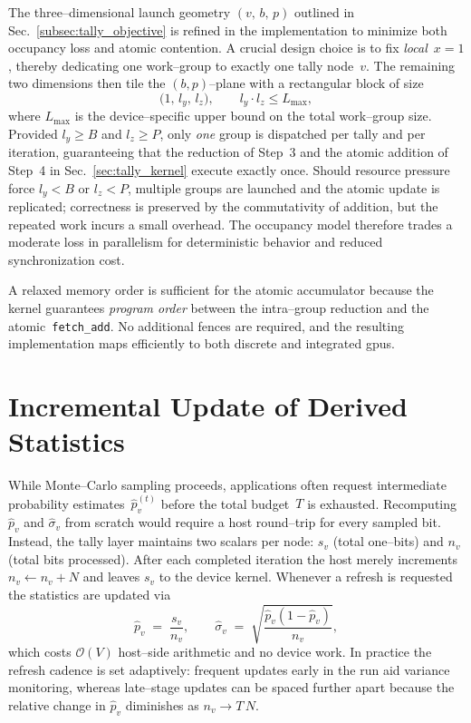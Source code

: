 The three--dimensional launch geometry \((v,\,b,\,p)\) outlined in
Sec.~\ref{subsec:tally_objective} is refined in the implementation to minimize
both occupancy loss and atomic contention.  A crucial design choice is to fix
\emph{local}~\(x=1\), thereby dedicating one work--group to exactly one tally
node~\(v\).  The remaining two dimensions then tile the \((b,p)\)--plane with a
rectangular block of size
\[
  \bigl(1,\,l_y,\,l_z\bigr),
  \qquad l_y\cdot l_z\le L_{\max},
\]
where \(L_{\max}\) is the device--specific upper bound on the total work--group
size.  Provided \(l_y\!\ge\!B\) and \(l_z\!\ge\!P\), only \emph{one} group is
dispatched per tally and per iteration, guaranteeing that the reduction of
Step~3 and the atomic addition of Step~4 in
Sec.~\ref{sec:tally_kernel} execute exactly once.  Should resource pressure
force \(l_y< B\) or \(l_z< P\), multiple groups are launched and the atomic
update is replicated; correctness is preserved by the commutativity of
addition, but the repeated work incurs a small overhead.  The occupancy model
therefore trades a moderate loss in parallelism for deterministic behavior and
reduced synchronization cost.

A relaxed memory order is sufficient for the atomic accumulator because the
kernel guarantees \emph{program order} between the intra--group reduction and
the atomic~\texttt{fetch\_add}.  No additional fences are required, and the
resulting implementation maps efficiently to both discrete and integrated
\acrshort{gpu}s.

\section{Incremental Update of Derived Statistics}
\label{subsec:tally_stats_refresh}

While Monte--Carlo sampling proceeds, applications often request intermediate
probability estimates~\(\widehat{p}_v^{(t)}\) before the total budget~\(T\) is
exhausted.  Recomputing \(\widehat{p}_v\) and
\(\widehat{\sigma}_v\) from scratch would require a host round--trip for every
sampled bit.  Instead, the tally layer maintains two scalars per node:
\(s_v\) (total one--bits) and \(n_v\) (total bits processed).  After each
completed iteration the host merely increments \(n_v\gets n_v + N\) and leaves
\(s_v\) to the device kernel.  Whenever a refresh is requested the statistics
are updated via
\[
  \widehat{p}_v\;=\;\frac{s_v}{n_v},
  \qquad
  \widehat{\sigma}_v\;=\;\sqrt{\frac{\widehat{p}_v(1-\widehat{p}_v)}{n_v}},
\]
which costs \(\mathcal{O}(V)\) host--side arithmetic and no device work.  In
practice the refresh cadence is set adaptively: frequent updates early in the
run aid variance monitoring, whereas late--stage updates can be spaced further
apart because the relative change in \(\widehat{p}_v\) diminishes as
\(n_v\to T\,N\).

